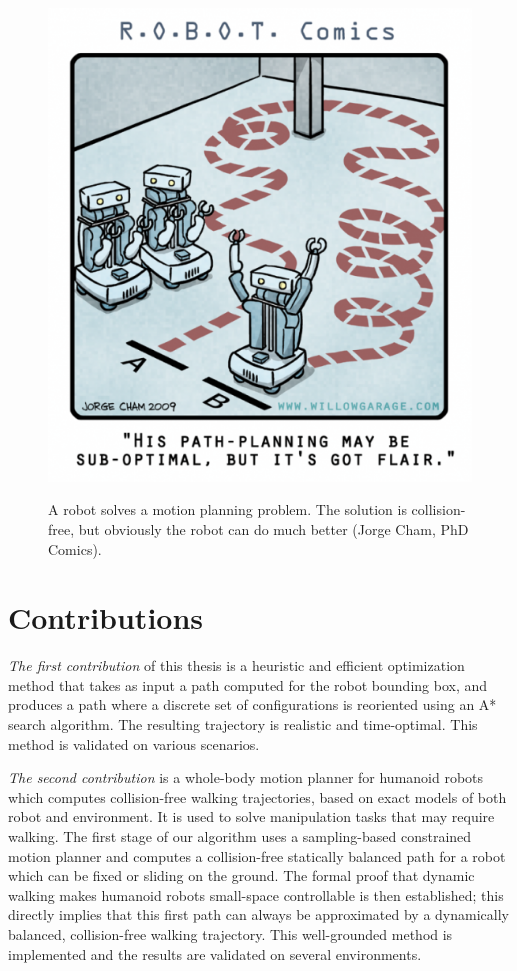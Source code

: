 \begin{figure}[h!]
  \centering
      {\includegraphics[width = 0.6\linewidth]
        {src/chap0-introduction/optimal-motion-planning.png}}
      \caption{A robot solves a motion planning problem. The solution
        is collision-free, but obviously the robot can do much better
        (Jorge Cham, PhD Comics).}
      \label{fig:chap0-optimal-motion-planning}
\end{figure}

\section{Contributions}

\emph{The first contribution} of this thesis is a heuristic and
efficient optimization method that takes as input a path computed for
the robot bounding box, and produces a path where a discrete set of
configurations is reoriented using an A* search algorithm. The
resulting trajectory is realistic and time-optimal. This method is
validated on various scenarios.

\emph{The second contribution} is a whole-body motion planner for
humanoid robots which computes collision-free walking trajectories,
based on exact models of both robot and environment. It is used to
solve manipulation tasks that may require walking. The first stage of
our algorithm uses a sampling-based constrained motion planner and
computes a collision-free statically balanced path for a robot which
can be fixed or sliding on the ground. The formal proof that dynamic
walking makes humanoid robots small-space controllable is then
established; this directly implies that this first path can always be
approximated by a dynamically balanced, collision-free walking
trajectory. This well-grounded method is implemented and the results
are validated on several environments.

